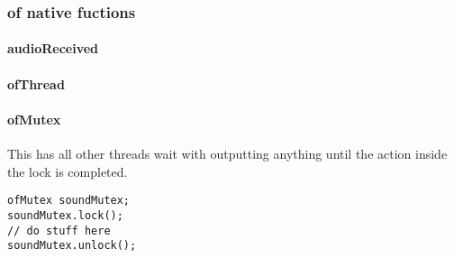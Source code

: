\subsubsection{of native fuctions}


\paragraph{audioReceived}

\paragraph{ofThread}

\paragraph{ofMutex} This has all other threads wait with outputting anything until the action inside the lock is completed. 
\begin{lstlisting}
ofMutex soundMutex;
soundMutex.lock();
// do stuff here
soundMutex.unlock();
\end{lstlisting}
